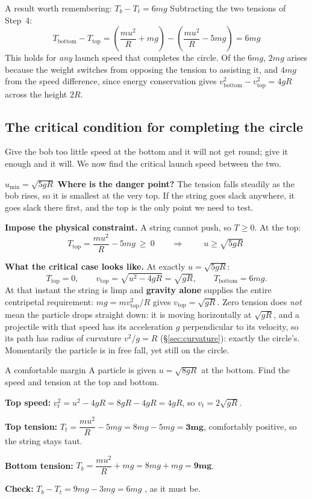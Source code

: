 \begin{keybox}{A result worth remembering: $T_b-T_t=6mg$}
Subtracting the two tensions of Step~4:
\[
T_{\text{bottom}}-T_{\text{top}}=\left(\frac{mu^{2}}{R}+mg\right)-\left(\frac{mu^{2}}{R}-5mg\right)
=\boxed{6mg}
\]
This holds for \emph{any} launch speed that completes the circle. Of the $6mg$, $2mg$ arises because the
weight switches from opposing the tension to assisting it, and $4mg$ from the speed difference, since energy
conservation gives $v_{\text{bottom}}^{2}-v_{\text{top}}^{2}=4gR$ across the height $2R$.
\end{keybox}

\subsection{The critical condition for completing the circle}
Give the bob too little speed at the bottom and it will not get round; give it enough and it will.
We now find the critical launch speed between the two.

\begin{derivbox}{$u_{\min}=\sqrt{5gR}$}
 \textbf{Where is the danger point?} The tension falls steadily as the bob rises, so it is
smallest at the very top. If the string goes slack anywhere, it goes slack there first, and the top is
the only point we need to test.

 \textbf{Impose the physical constraint.} A string cannot push, so $T\ge0$. At the top:
\[
T_{\text{top}}=\frac{mu^{2}}{R}-5mg\ \ge\ 0
\qquad\Longrightarrow\qquad
\boxed{\;u\ge\sqrt{5gR}\;}
\]

 \textbf{What the critical case looks like.} At exactly $u=\sqrt{5gR}$:
\[
T_{\text{top}}=0,\qquad
v_{\text{top}}=\sqrt{u^{2}-4gR}=\sqrt{gR},\qquad
T_{\text{bottom}}=6mg.
\]
At that instant the string is limp and \textbf{gravity alone} supplies the entire centripetal
requirement: $mg=mv_{\text{top}}^{2}/R$ gives $v_{\text{top}}=\sqrt{gR}$. Zero tension does
\emph{not} mean the particle drops straight down: it is moving horizontally at $\sqrt{gR}$, and a
projectile with that speed has its acceleration $g$ perpendicular to its velocity, so its path has radius
of curvature $v^{2}/g=R$ (\S\ref{sec:curvature}): exactly the circle's. Momentarily the particle is in
free fall, yet still on the circle.
\end{derivbox}

\begin{exbox}{A comfortable margin}
A particle is given $u=\sqrt{8gR}$ at the bottom. Find the speed and tension at the top and bottom.

 \textbf{Top speed:} $v_t^{2}=u^{2}-4gR=8gR-4gR=4gR$, so $v_t=2\sqrt{gR}$.

 \textbf{Top tension:} $T_t=\dfrac{mu^{2}}{R}-5mg=8mg-5mg=\mathbf{3mg}$, comfortably
positive, so the string stays taut.

 \textbf{Bottom tension:} $T_b=\dfrac{mu^{2}}{R}+mg=8mg+mg=\mathbf{9mg}$.

 \textbf{Check:} $T_b-T_t=9mg-3mg=6mg$ \checkmark, as it must be.
\end{exbox}

